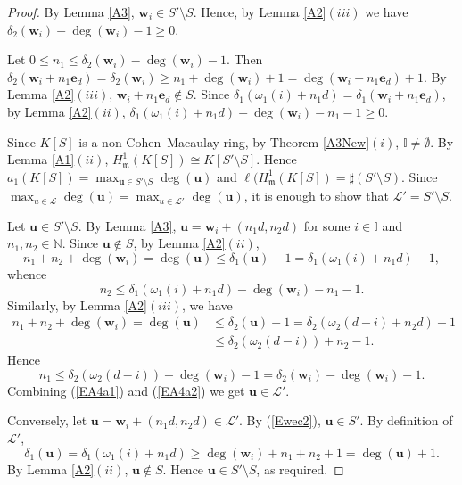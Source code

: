 \documentclass[11pt]{article}
\def\deg{\operatorname{deg}}
\def\mfr{{\frak m}}
\def\ebf{{\mathbf e}}
\def\ubf{{\mathbf u}}
\def\wbf{{\mathbf w}}
\def\mfr{{\mathfrak m}}
\def\Lcal{{\mathcal L}}
\def\Nset{{\mathbb N}}
\def\Iset{{\mathbb I}}
\theoremstyle{remark}
\theoremstyle{definition}
\begin{document}
\begin{proof} By Lemma \ref{A3}, $\wbf_i \in S'\setminus S$. Hence, by Lemma \ref{A2}\((iii)\) we have $\delta_2(\wbf_i) - \deg(\wbf_i) - 1\geq 0$. 

Let $0\leq n_1 \le \delta_2(\wbf_i) - \deg(\wbf_i) - 1$. Then $\delta_2(\wbf_i + n_1\ebf_d) =  \delta_2(\wbf_i) \geq n_1 +  \deg(\wbf_i) + 1 = \deg(\wbf_i + n_1\ebf_d) + 1$. By Lemma \ref{A2}\((iii)\), $\wbf_i + n_1\ebf_d \not\in S$. Since $\delta_1(\omega_1(i) + n_1d) = \delta_1(\wbf_i + n_1\ebf_d)$, by Lemma \ref{A2}\((ii)\), $\delta_1(\omega_1(i) + n_1d) - \deg(\wbf_i) - n_1 -1 \geq 0$.

Since $K[S]$ is a non-Cohen--Macaulay ring, by Theorem \ref{A3New}\((i)\),  $\Iset \neq \emptyset$. 
By Lemma \ref{A1}\((ii)\), $H^1_{\mfr}(K[S]) \cong K[S'\setminus S]$. Hence $a_1(K[S]) = \max_{\ubf \in S'\setminus S} \deg(\ubf)$ and $ \ell(H^1_{\mfr}(K[S]) = \sharp (S'\setminus S)$. Since $\max_{u\in \Lcal} \deg(\ubf) = \max_{u\in \Lcal'} \deg(\ubf)$, it  is enough to show that $\Lcal' = S'\setminus S$.

Let $\ubf \in S'\setminus S$. By Lemma \ref{A3}, $\ubf = \wbf_i + (n_1d, n_2d)$ for some $i\in \Iset$ and $n_1,n_2\in \Nset$. Since $\ubf \not\in S$, by Lemma \ref{A2}\((ii)\),
$$n_1 + n_2 + \deg(\wbf_i) = \deg(\ubf) \leq \delta_1(\ubf)  - 1 = \delta_1(\omega_1(i) + n_1d) -1,$$
whence
\begin{equation}\label{EA4a1}
n_2 \le \delta_1(\omega_1(i) + n_1d) - \deg(\wbf_i) - n_1 - 1.
\end{equation}
Similarly, by Lemma \ref{A2}\((iii)\), we have
\begin{align*}
    n_1 + n_2 + \deg(\wbf_i) = \deg(\ubf) & \leq \delta_2(\ubf)  - 1 = \delta_2(\omega_2(d-i) + n_2d) - 1\\
&\leq \delta_2(\omega_2(d-i)) + n_2 - 1.
\end{align*}
Hence 
\begin{equation}\label{EA4a2}
n_1 \leq \delta_2(\omega_2(d-i))  - \deg(\wbf_i) - 1 = \delta_2(\wbf_i) - \deg(\wbf_i) - 1.
\end{equation}
Combining (\ref{EA4a1}) and (\ref{EA4a2}) we get $\ubf \in \Lcal'$.

Conversely, let $\ubf = \wbf_i + (n_1d, n_2d) \in \Lcal'$. By (\ref{Ewec2}), $\ubf \in S'$. By definition of $\Lcal'$,
$$\delta_1(\ubf) = \delta_1( \omega_1(i) + n_1d) \geq \deg(\wbf_i) + n_1 + n_2 + 1 = \deg(\ubf) + 1.$$
By Lemma \ref{A2}\((ii)\), $\ubf \not\in S$. Hence $\ubf\in S' \setminus S$, as required.
\end{proof}
\end{document}
